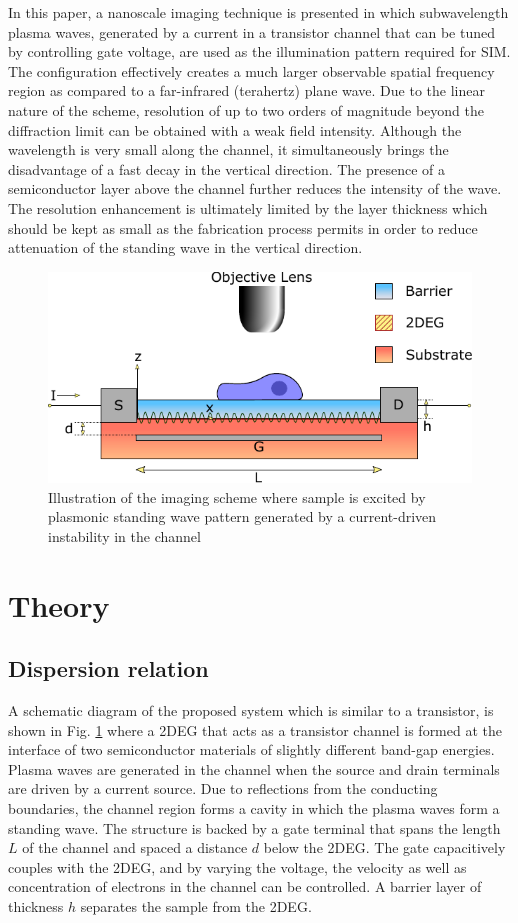 \documentclass[10pt]{article}
\renewcommand{\^}{\hat}  %
\renewcommand{\^}{\hat}  %
\begin{document}
In this paper, a nanoscale imaging technique is presented in which subwavelength plasma waves, generated by a current in a transistor channel that can be tuned by controlling gate voltage, are used as the illumination pattern required for SIM. The configuration effectively creates a much larger observable spatial frequency region as compared to a far-infrared (terahertz) plane wave. Due to the linear nature of the scheme, resolution of up to two orders of magnitude beyond the diffraction limit can be obtained with a weak field intensity. Although the wavelength is very small along the channel, it simultaneously brings the disadvantage of a fast decay in the vertical direction. The presence of a semiconductor layer above the channel further reduces the intensity of the wave. The resolution enhancement is ultimately limited by the layer thickness which should be kept as small as the fabrication process permits in order to reduce attenuation of the standing wave in the vertical direction.
%
\begin{figure}[t!]
  \centering
  \includegraphics[width=.75\linewidth]{figures/mstruc_gated1}
  \caption{Illustration of the imaging scheme where sample is excited by plasmonic standing wave pattern generated by a current-driven instability in the channel}
  \label{fig:struct}
\end{figure}
%
%
\section{Theory}
\subsection{Dispersion relation}
%
A schematic diagram of the proposed system which is similar to a transistor, is shown in Fig. \ref{fig:struct} where a 2DEG that acts as a transistor channel is formed at the interface of two semiconductor materials of slightly different band-gap energies. Plasma waves are generated in the channel when the source and drain terminals are driven by a current source. Due to reflections from the conducting boundaries, the channel region forms a cavity in which the plasma waves form a standing wave. The structure is backed by a gate terminal that spans the length $L$ of the channel and spaced a distance $d$ below the 2DEG. The gate capacitively couples with the 2DEG, and by varying the voltage, the velocity as well as concentration of electrons in the channel can be controlled. A barrier layer of thickness $h$ separates the sample from the 2DEG.
\end{document}
